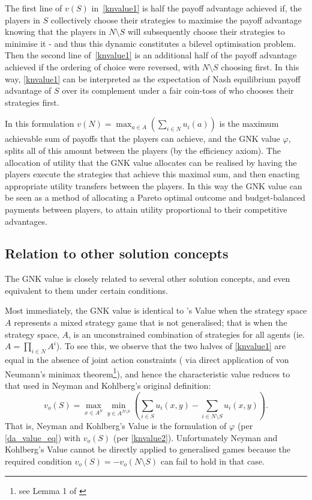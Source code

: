 The first line of $v(S)$ in~\eqref{knvalue1} is half the payoff advantage achieved if, the players in $S$ collectively choose their strategies to maximise the payoff advantage knowing that the players in $N\setminus S$ will subsequently choose their strategies to minimise it - and thus this dynamic constitutes a bilevel optimisation problem.
Then the second line of~\eqref{knvalue1} is an additional half of the payoff advantage achieved if the ordering of choice were reversed, with $N\setminus S$ choosing first.
In this way, \eqref{knvalue1} can be interpreted as the expectation of Nash equilibrium payoff advantage of $S$ over its complement under a fair coin-toss of who chooses their strategies first.

In this formulation $v(N) = \max_{a\in A} (\sum_{i\in N} u_i(a))$ is the maximum achievable sum of payoffs that the players can achieve, and the GNK value $\varphi$, splits all of this amount between the players (by the efficiency axiom).
The allocation of utility that the GNK value allocates can be realised by having the players execute the strategies that achieve this maximal sum, and then enacting appropriate utility transfers between the players.
In this way the GNK value can be seen as a method of allocating a Pareto optimal outcome and budget-balanced payments between players, to attain utility proportional to their competitive advantages.

\subsection{Relation to other solution concepts}\label{relating_to_the_old}

The GNK value is closely related to several other solution concepts, and even equivalent to them under certain conditions.

Most immediately, the GNK value is identical to \cite{value2}'s Value when the strategy space $A$ represents a mixed strategy game that is not generalised; that is when the strategy space, $A$, is an unconstrained combination of strategies for all agents (ie. $A = \prod_{i\in N}A^i$).
To see this, we observe that the two halves of \eqref{knvalue1} are equal in the absence of joint action constraints (%
via direct application of von Neumann's minimax theorem\footnote{see Lemma 1 of \cite{value2}}), 
and hence the characteristic value reduces to that used in Neyman and Kohlberg's original definition:
\begin{equation}\label{knvalue2}v_o(S) = \max_{x\in A^S}\min_{y\in A^{N\setminus S}} \left(\sum_{i\in S} u_i(x,y) - \sum_{i\in N\setminus S} u_i(x,y) \right).\end{equation}
%
That is, Neyman and Kohlberg's Value is the formulation of $\varphi$ (per \eqref{da_value_eq}) 
with $v_o(S)$ (per \eqref{knvalue2}).
Unfortunately Neyman and Kohlberg's Value cannot be directly applied to generalised games because the required condition $v_o(S)=-v_o(N\setminus S)$ can fail to hold in that case. 

